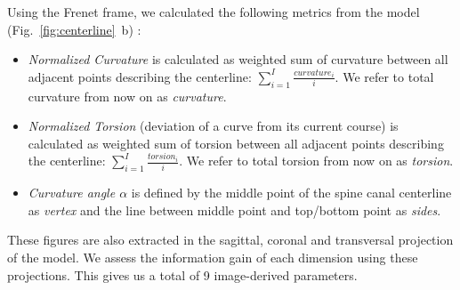 \documentclass[a4paper,twoside]{style/article}
\newcommand{\com}[1]{\textcolor{orange}{\uline{#1}}}
\begin{document}
Using the Frenet frame, we calculated the following metrics from the model (Fig.~\ref{fig:centerline}~b) \cite{Frenet}:
\begin{itemize}
	\item \emph{Normalized Curvature} is calculated as weighted sum of curvature between all adjacent points describing the centerline: $\sum_{i=1}^I \frac{curvature_i}{i}$. We refer to total curvature from now on as \emph{curvature}.
	\item \emph{Normalized Torsion} (deviation of a curve from its current course) is calculated as weighted sum of torsion between all adjacent points describing the centerline: $\sum_{i=1}^I \frac{torsion_i}{i}$. We refer to total torsion from now on as \emph{torsion}.
	\item \emph{Curvature angle $\alpha$} is defined by the middle point of the spine canal centerline as \emph{vertex} and the line between middle point and top/bottom point as \emph{sides}.
\end{itemize}
These figures are also extracted in the sagittal, coronal and transversal projection of the model.
We assess the information gain of each dimension using these projections.
This gives us a total of 9 image-derived parameters.


\end{document}
